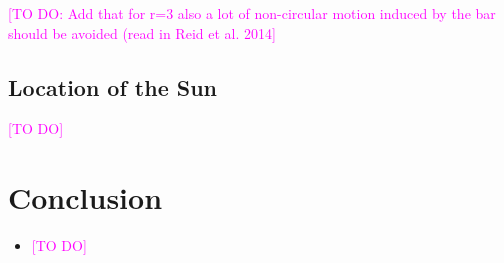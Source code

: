 \documentclass[iop,revtex4,numberedappendix,appendixfloats]{emulateapj}
\newcommand{\Wilma}[1]{\textcolor{Magenta}{#1}}
\begin{document}
\Wilma{[TO DO: Add that for r=3 also a lot of non-circular motion induced by the bar should be avoided (read in Reid et al. 2014]}

\subsection{Location of the Sun}




\Wilma{[TO DO]}




\section{Conclusion} \label{sec:conclusion}

\begin{itemize}
\item \Wilma{[TO DO]}
\end{itemize}


\end{document}
